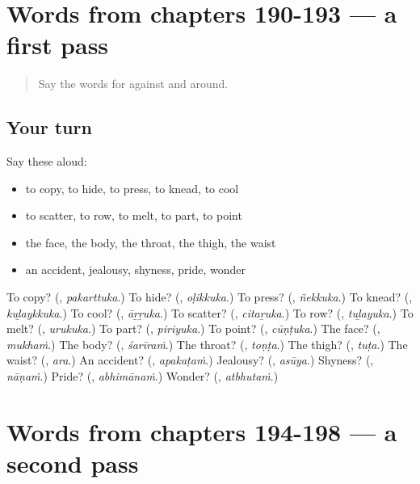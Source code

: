\section[(dialogue)]{Words from chapters 190-193 — a first pass}

\label{lesson:ML-R198-first-pass-words-from-chapters-190-193}



\begin{quote}
Say the words for against and around.
\end{quote}

\subsection*{Your turn}
Say these aloud:

\begin{itemize}
\raggedright
  \item to copy, to hide, to press, to knead, to cool
  \item to scatter, to row, to melt, to part, to point
  \item the face, the body, the throat, the thigh, the waist
  \item an accident, jealousy, shyness, pride, wonder
\end{itemize}

\begin{tcolorbox}[breakable,colback=teal!4,colframe=teal!35!black,title={Before you move on}]
To copy? (\textbf{}, \emph{pakarttuka}.) To hide? (\textbf{}, \emph{oḷikkuka}.) To press? (\textbf{}, \emph{ñekkuka}.) To knead? (\textbf{}, \emph{kuḻaykkuka}.) To cool? (\textbf{}, \emph{āṟṟuka}.) To scatter? (\textbf{}, \emph{citaṟuka}.) To row? (\textbf{}, \emph{tuḻayuka}.) To melt? (\textbf{}, \emph{urukuka}.) To part? (\textbf{}, \emph{piriyuka}.) To point? (\textbf{}, \emph{cūṇṭuka}.) The face? (\textbf{}, \emph{mukhaṁ}.) The body? (\textbf{}, \emph{śarīraṁ}.) The throat? (\textbf{}, \emph{toṇṭa}.) The thigh? (\textbf{}, \emph{tuṭa}.) The waist? (\textbf{}, \emph{ara}.) An accident? (\textbf{}, \emph{apakaṭaṁ}.) Jealousy? (\textbf{}, \emph{asūya}.) Shyness? (\textbf{}, \emph{nāṇaṁ}.) Pride? (\textbf{}, \emph{abhimānaṁ}.) Wonder? (\textbf{}, \emph{atbhutaṁ}.)
\end{tcolorbox}
\section[(dialogue)]{Words from chapters 194-198 — a second pass}

